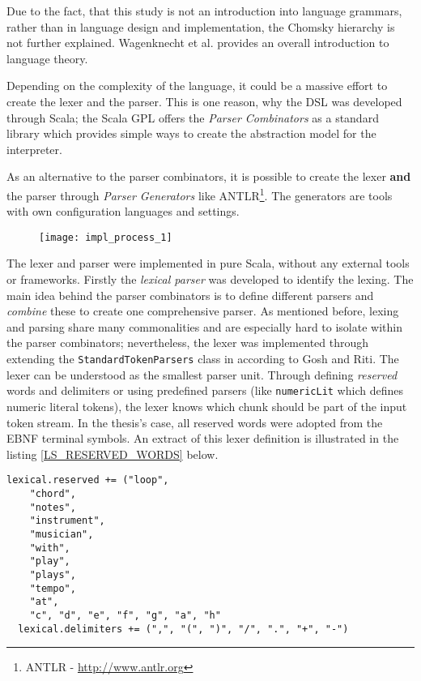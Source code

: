 Due to the fact, that this study is not an introduction into language grammars, rather than in language design and implementation, the Chomsky hierarchy is not further explained. Wagenknecht et al. provides an overall introduction to language theory.\cite{Wagenknecht2014}

Depending on the complexity of the language, it could be a massive effort to create the lexer and the parser.\cite{Ghosh2010} This is one reason, why the DSL was developed through Scala; the Scala GPL offers the \textit{Parser Combinators} as a standard library which provides simple ways to create the abstraction model for the interpreter.

As an alternative to the parser combinators, it is possible to create the lexer \textbf{and} the parser through \textit{Parser Generators} like ANTLR\footnote{ANTLR - \url{http://www.antlr.org}}. The generators are tools with own configuration languages and settings.

\begin{figure}[h]
\centering
\texttt{[image: impl\_process\_1]}
\end{figure}

The lexer and parser were implemented in pure Scala, without any external tools or frameworks.\cite{Schmitt2014} Firstly the \textit{lexical parser} was developed to identify the lexing. The main idea behind the parser combinators is to define different parsers and \textit{combine} these to create one comprehensive parser.\cite{Riti2018} As mentioned before, lexing and parsing share many commonalities and are especially hard to isolate within the parser combinators; nevertheless, the lexer was implemented through extending the \texttt{StandardTokenParsers} class in according to Gosh and Riti.\cite{Ghosh2010, Riti2018} The lexer can be understood as the smallest parser unit. Through defining \textit{reserved} words and delimiters or using predefined parsers (like \texttt{numericLit} which defines numeric literal tokens), the lexer knows which chunk should be part of the input token stream. In the thesis's case, all reserved words were adopted from the EBNF terminal symbols. An extract of this lexer definition is illustrated in the listing \ref{LS_RESERVED_WORDS} below.

\begin{lstlisting}[caption={Defining the reserved words and delimiters through Scala's \texttt{StandardTokenParsers}}, label=LS_RESERVED_WORDS]
lexical.reserved += ("loop",
    "chord",
    "notes",
    "instrument",
    "musician",
    "with",
    "play",
    "plays",
    "tempo",
    "at",
    "c", "d", "e", "f", "g", "a", "h"
  lexical.delimiters += (",", "(", ")", "/", ".", "+", "-")
\end{lstlisting}

